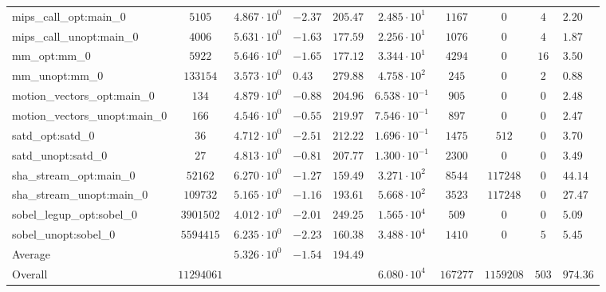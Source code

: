 \begin{tabular}{|l|c|HHc|c|c|c|cH|}
mips\_call\_opt:main\_0                         & $ 5105     $ & $ 4.867 \cdot 10^{0} $ & $ -2.37 $ & $ 205.47 $ & $ 2.485 \cdot 10^{1}  $ & $ 1167   $ & $ 0       $ & $ 4   $ & $ 2.20    $ \\
mips\_call\_unopt:main\_0                       & $ 4006     $ & $ 5.631 \cdot 10^{0} $ & $ -1.63 $ & $ 177.59 $ & $ 2.256 \cdot 10^{1}  $ & $ 1076   $ & $ 0       $ & $ 4   $ & $ 1.87    $ \\
mm\_opt:mm\_0                                   & $ 5922     $ & $ 5.646 \cdot 10^{0} $ & $ -1.65 $ & $ 177.12 $ & $ 3.344 \cdot 10^{1}  $ & $ 4294   $ & $ 0       $ & $ 16  $ & $ 3.50    $ \\
mm\_unopt:mm\_0                                 & $ 133154   $ & $ 3.573 \cdot 10^{0} $ & $ 0.43  $ & $ 279.88 $ & $ 4.758 \cdot 10^{2}  $ & $ 245    $ & $ 0       $ & $ 2   $ & $ 0.88    $ \\
motion\_vectors\_opt:main\_0                    & $ 134      $ & $ 4.879 \cdot 10^{0} $ & $ -0.88 $ & $ 204.96 $ & $ 6.538 \cdot 10^{-1} $ & $ 905    $ & $ 0       $ & $ 0   $ & $ 2.48    $ \\
motion\_vectors\_unopt:main\_0                  & $ 166      $ & $ 4.546 \cdot 10^{0} $ & $ -0.55 $ & $ 219.97 $ & $ 7.546 \cdot 10^{-1} $ & $ 897    $ & $ 0       $ & $ 0   $ & $ 2.47    $ \\
satd\_opt:satd\_0                               & $ 36       $ & $ 4.712 \cdot 10^{0} $ & $ -2.51 $ & $ 212.22 $ & $ 1.696 \cdot 10^{-1} $ & $ 1475   $ & $ 512     $ & $ 0   $ & $ 3.70    $ \\
satd\_unopt:satd\_0                             & $ 27       $ & $ 4.813 \cdot 10^{0} $ & $ -0.81 $ & $ 207.77 $ & $ 1.300 \cdot 10^{-1} $ & $ 2300   $ & $ 0       $ & $ 0   $ & $ 3.49    $ \\
sha\_stream\_opt:main\_0                        & $ 52162    $ & $ 6.270 \cdot 10^{0} $ & $ -1.27 $ & $ 159.49 $ & $ 3.271 \cdot 10^{2}  $ & $ 8544   $ & $ 117248  $ & $ 0   $ & $ 44.14   $ \\
sha\_stream\_unopt:main\_0                      & $ 109732   $ & $ 5.165 \cdot 10^{0} $ & $ -1.16 $ & $ 193.61 $ & $ 5.668 \cdot 10^{2}  $ & $ 3523   $ & $ 117248  $ & $ 0   $ & $ 27.47   $ \\
sobel\_legup\_opt:sobel\_0                      & $ 3901502  $ & $ 4.012 \cdot 10^{0} $ & $ -2.01 $ & $ 249.25 $ & $ 1.565 \cdot 10^{4}  $ & $ 509    $ & $ 0       $ & $ 0   $ & $ 5.09    $ \\
sobel\_unopt:sobel\_0                           & $ 5594415  $ & $ 6.235 \cdot 10^{0} $ & $ -2.23 $ & $ 160.38 $ & $ 3.488 \cdot 10^{4}  $ & $ 1410   $ & $ 0       $ & $ 5   $ & $ 5.45    $ \\
\hline
Average                                         & $          $ & $ 5.326 \cdot 10^{0} $ & $ -1.54 $ & $ 194.49 $ & $                     $ & $        $ & $         $ & $     $ & $         $ \\
\hline
Overall                                         & $ 11294061 $ & $                    $ & $       $ & $        $ & $ 6.080 \cdot 10^{4}  $ & $ 167277 $ & $ 1159208 $ & $ 503 $ & $ 974.36  $ \\
\hline
\end{tabular}
